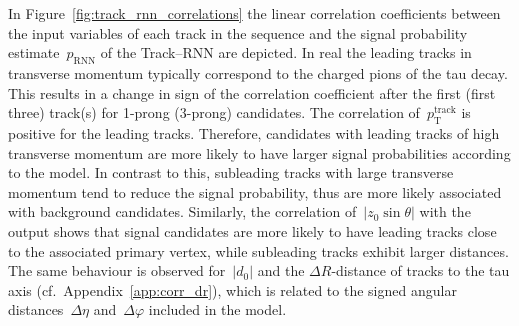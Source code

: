 In Figure~\ref{fig:track_rnn_correlations} the linear correlation coefficients
between the input variables of each track in the sequence and the signal
probability estimate~$p_\text{RNN}$ of the Track--RNN are depicted. In real
\tauhadvis the leading tracks in transverse momentum typically correspond to the
charged pions of the tau decay. This results in a change in sign of the
correlation coefficient after the first (first three) track(s) for 1-prong
(3-prong) candidates. The correlation of~$p_\text{T}^\text{track}$
is positive for the leading tracks. Therefore, \tauhadvis candidates with
leading tracks of high transverse momentum are more likely to have larger signal
probabilities according to the model. In contrast to this, subleading tracks
with large transverse momentum tend to reduce the signal probability, thus are
more likely associated with background \tauhadvis candidates. Similarly, the
correlation of~$|z_0 \sin\theta|$ with the output
shows that signal candidates are more likely to have leading tracks close to the
associated primary vertex, while subleading tracks exhibit larger distances. The
same behaviour is observed for~$|d_0|$ and the $\Delta R$-distance of tracks to
the tau axis (cf.\ Appendix~\ref{app:corr_dr}), which is related to the signed
angular distances~$\Delta \eta$ and~$\Delta \varphi$ included in the model.

